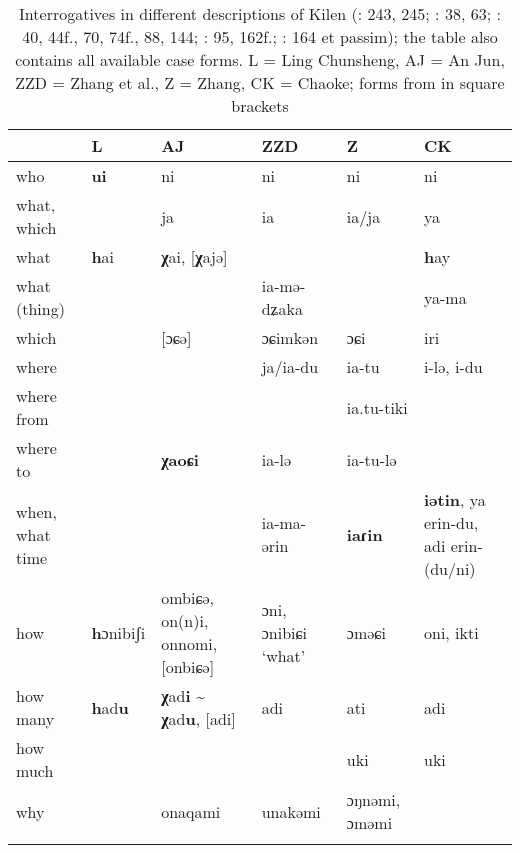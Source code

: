 \begin{table}[t]
\caption{Interrogatives in different descriptions of Kilen (\citealt{Ling1934}: 243, 245; \citealt{AnJun1986}: 38, 63; \citealt{ZhangLiZhang1989}: 40, 44f., 70, 74f., 88, 144; \citealt{ZhangPaiyu2013}: 95, 162f.; \citealt{Chaoke2014b}: 164 et passim); the table also contains all available case forms. L = Ling Chunsheng, AJ = An Jun, ZZD = Zhang et al., Z = Zhang, CK = Chaoke; forms from \citet{AnJun1984} in square brackets}
\label{tab:tungu:31}

\begin{tabularx}{\textwidth}{llQQQQ}
\lsptoprule
& \textbf{L} & \textbf{AJ} & \textbf{ZZD} & \textbf{Z} & \textbf{CK}\\
\midrule
who & \textbf{ui} & ni & ni & ni & ni\\
what, which &  & ja & ia & ia/ja & ya\\
what & \textbf{h}ai & \textbf{χ}ai, [\textbf{χ}ajə] &  &  & \textbf{h}ay\\
what (thing) &  &  & ia-mə-dʑaka &  & ya-ma\\
which &  & [ɔɕə] & ɔɕimkən & ɔɕi & iri\\
where &  &  & ja/ia-du & ia-tu & i-lə, i-du\\
where from &  &  &  & ia.tu-tiki & \\
where to &  & \textbf{χaoɕi} & ia-lə & ia-tu-lə & \\
when, what time &  &  & ia-ma-ərin & \textbf{iaɾin} & \textbf{iətin}, ya erin-du, adi erin-(du/ni)\\
how & \textbf{h}ɔnibiʃi & ombiɕə, on(n)i, onnomi, [onbiɕə] & ɔni, ɔnibiɕi ‘what’ & ɔməɕi & oni, ikti\\
how many & \textbf{h}ad\textbf{u} & \textbf{χ}ad\textbf{i} {\textasciitilde} \textbf{χ}ad\textbf{u}, [adi] & adi & ati & adi\\
how much &  &  &  & uki & uki\\
why &  & onaqami & unakəmi & ɔŋnəmi, ɔməmi & \\
\lspbottomrule
\end{tabularx}
\end{table}

